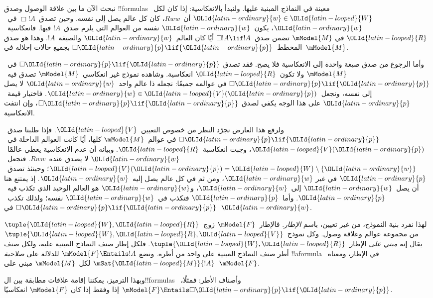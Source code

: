 \documentclass[../../../include/open-logic-section]{subfiles}
\begin{document}


نبحث الآن ما بين علاقة الوصول وصدق !!{formula}s معينة في النماذج
المبنية عليها. ولنبدأ بالانعكاسية: إذا كان لكل~${\OLId{latin-ordinary}{w}} \in {\OLId{latin-looped}{W}}$ أن~$Rww$،
كان كل عالم يصل إلى نفسه. وحين تصدق~$\Box !A$ في~${\OLId{latin-ordinary}{w}}$، يكون~${\OLId{latin-ordinary}{w}}$
نفسه من العوالم التي يلزم صدق~$!A$ فيها. فانعكاسية~${\OLId{latin-looped}{R}}$ في
$\mModel{M}$ تضمن صدق~$\Box !A \lif !A$ أيًا كان العالم~${\OLId{latin-ordinary}{w}}$
والصيغة~$!A$. وهذا هو صدق المخطط~$\Box {\OLId{latin-ordinary}{p}} \lif {\OLId{latin-ordinary}{p}}$ بجميع حالات
إحلاله في~$\mModel{M}$.

وأما الرجوع من صدق صيغة واحدة إلى الانعكاسية فلا يصح. فقد تصدق
$\Box {\OLId{latin-ordinary}{p}} \lif {\OLId{latin-ordinary}{p}}$ في~$\mModel{M}$ ولا تكون~${\OLId{latin-looped}{R}}$ انعكاسية.
وشاهده نموذج غير انعكاسي~$\mModel{M}$ تصدق فيه~$\Box {\OLId{latin-ordinary}{p}} \lif {\OLId{latin-ordinary}{p}}$
في عوالمه جميعًا: نجعله ذا عالم واحد~${\OLId{latin-ordinary}{w}}$ لا يصل إلى نفسه،
ونجعل~${\OLId{latin-ordinary}{w}} \in {\OLId{latin-looped}{V}}({\OLId{latin-ordinary}{p}})$. فاختيار قيمة~${\OLId{latin-ordinary}{p}}$ على هذا الوجه يكفي لصدق
$\Box {\OLId{latin-ordinary}{p}} \lif {\OLId{latin-ordinary}{p}}$، وإن انتفت الانعكاسية.

ولرفع هذا العارض نجرّد النظر من خصوص التعيين~${\OLId{latin-looped}{V}}$.
فإذا طلبنا صدق~$\Box {\OLId{latin-ordinary}{p}} \lif {\OLId{latin-ordinary}{p}}$ في عوالم~$\mModel{M}$ كلها،
أيًا كانت العوالم الداخلة في~${\OLId{latin-looped}{V}}({\OLId{latin-ordinary}{p}})$، وجبت انعكاسية~${\OLId{latin-looped}{R}}$.
وبيانه أن عدم الانعكاسية يعطي عالمًا~${\OLId{latin-ordinary}{w}}$ لا يصدق عنده~$Rww$.
فنجعل~${\OLId{latin-looped}{V}}({\OLId{latin-ordinary}{p}}) = {\OLId{latin-looped}{W}} \setminus \{{\OLId{latin-ordinary}{w}}\}$؛ وحينئذ تصدق~${\OLId{latin-ordinary}{p}}$ في غير
${\OLId{latin-ordinary}{w}}$، ومن ثم في كل عالم يصل إليه~${\OLId{latin-ordinary}{w}}$. إذ يمتنع هنا أن يصل~${\OLId{latin-ordinary}{w}}$
إلى~${\OLId{latin-ordinary}{w}}$، و${\OLId{latin-ordinary}{w}}$ هو العالم الوحيد الذي تكذب فيه~${\OLId{latin-ordinary}{p}}$.
وأما~${\OLId{latin-ordinary}{p}}$ فتكذب في~${\OLId{latin-ordinary}{w}}$ نفسه؛ ولذلك تكذب~$\Box {\OLId{latin-ordinary}{p}} \lif {\OLId{latin-ordinary}{p}}$ في~${\OLId{latin-ordinary}{w}}$.

لهذا نفرد بنية النموذج، من غير تعيين، باسم \emph{الإطار}.
فالإطار~$\mModel{F}$ زوج~$\tuple{{\OLId{latin-looped}{W}}, {\OLId{latin-looped}{R}}}$ من مجموعة عوالم وعلاقة
وصول. وكل نموذج~$\tuple{{\OLId{latin-looped}{W}}, {\OLId{latin-looped}{R}}, {\OLId{latin-looped}{V}}}$ يقال إنه \emph{مبني على}
الإطار~$\tuple{{\OLId{latin-looped}{W}}, {\OLId{latin-looped}{R}}}$. فلكل إطار صنف النماذج المبنية عليه،
ولكل صنف أطر صنف النماذج المبنية على واحد من أطره. ونضع
$\mModel{F} \Entails !A$ للدلالة على \emph{صلاحية} !!a{formula}
في الإطار، ومعناه~$\mSat{{\OLId{latin-looped}{M}}}{!A}$ لكل~$\mModel{M}$ مبني
على~$\mModel{F}$.

وبهذا الترميز، يمكننا إقامة علاقات مطابقة بين ال!!{formula}s وأصناف
الأطر: فمثلًا،~$\mModel{F} \Entails \Box {\OLId{latin-ordinary}{p}} \lif {\OLId{latin-ordinary}{p}}$ إذا وفقط إذا كان
$\mModel{F}$ انعكاسيًا.
\end{document}

